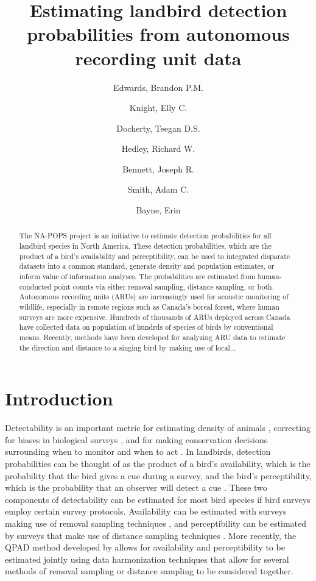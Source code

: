\documentclass[12pt]{article}
\title{Estimating landbird detection probabilities from autonomous recording unit data}
\author{
	Edwards, Brandon P.M.\\
	\and
	Knight, Elly C.\\
	\and
	Docherty, Teegan D.S.\\
	\and
	Hedley, Richard W.\\
	\and
	Bennett, Joseph R.\\
	\and
	Smith, Adam C.\\
	\and
	Bayne, Erin\\
}
\begin{document}
\maketitle

\begin{abstract}

The NA-POPS project is an initiative to estimate detection probabilities for all landbird species in North America. These detection probabilities, which are the product of a bird's availability and perceptibility, can be used to integrated disparate datasets into a common standard, generate density and population estimates, or inform value of information analyses. The probabilities are estimated from human-conducted point counts via either removal sampling, distance sampling, or both. Autonomous recording units (ARUs) are increasingly used for acoustic monitoring of wildlife, especially in remote regions such as Canada's boreal forest, where human surveys are more expensive. Hundreds of thousands of ARUs deployed across Canada have collected data on population of hundrds of species of birds by conventional means. Recently, methods have been developed for analyzing ARU data to estimate the direction and distance to a singing bird by making use of local...

\end{abstract}

\section{Introduction}
\par Detectability is an important metric for estimating density of animals \citep{solymos_lessons_2020}, correcting for biases in biological surveys \citep{solymos_calibrating_2013}, and for making conservation decisions surrounding when to monitor and when to act \citep{bennett_how_nodate}. In landbirds, detection probabilities can be thought of as the product of a bird's availability, which is the probability that the bird gives a cue during a survey, and the bird's perceptibility, which is the probability that an observer will detect a cue \citep{buckland_distance_2015}. These two components of detectability can be estimated for most bird species if bird surveys employ certain survey protocols. Availability can be estimated with surveys making use of removal sampling techniques \citep{farnsworth_removal_2002}, and perceptibility can be estimated by surveys that make use of distance sampling techniques \citep{buckland_introduction_2001, buckland_distance_2015}. More recently, the QPAD method developed by \cite{solymos_calibrating_2013} allows for availability and perceptibility to be estimated jointly using data harmonization techniques \citep{barker_ecological_2015} that allow for several methods of removal sampling or distance sampling to be considered together. 
\end{document}
